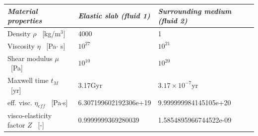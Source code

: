 \begin{center}
\begin{tabular}{lll}
\hline 
\textit{Material properties}& \textit{Elastic slab (fluid 1)}  & \textit{Surrounding medium (fluid 2)} \\
\hline 
\hline 
Density         $\rho$ \     [kg/m$^{3}$]      & 4000                    & 1     \\
Viscosity       $\eta$ \    [Pa$\cdot$ s]      & $10^{27}$               &   $10^{21}$     \\
Shear modulus   $\mu $ \    [Pa]               & $10^{10}$               & $10^{20}$       \\
Maxwell time $t_M$     \    [yr]               & 3.17Gyr                 &  $3.17\times10^{-7}$yr       \\
eff. visc.      $\eta_{eff}$ \ [Pa$\cdot$s]    & 6.307199602192306e+19   &  9.999999984145105e+20      \\
visco-elasticity factor $Z$      \ [-]         & 0.9999999369280039      &  1.5854895966744522e-09     \\
\hline 
\end{tabular} 
\end{center}

